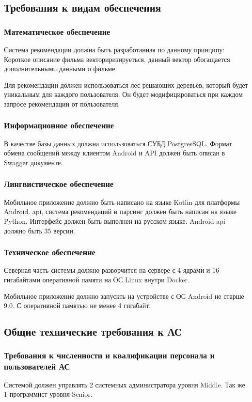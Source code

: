 \subsection{Требования к видам обеспечения}
\subsubsection{Математическое обеспечение}
Система рекомендации должна быть разработанная по данному принципу:
Короткое описание фильма векториризируеться, данный вектор обогащается дополнительными данными о фильме.

Для рекомендации должен использоваться лес решающих деревьев, который будет уникальным для каждого пользователя.
Он будет модифицироваться при каждом запросе рекомендации от пользователя.

\subsubsection{Информационное обеспечение}
В качестве базы данных должна использоваться СУБД PostgresSQL\@.
Формат обмена сообщений между клиентом Android и API должен быть описан в Swagger документе.


\subsubsection{Лингвистическое обеспечение}
Мобильное приложение должно быть написано на языке Kotlin для платформы Android.
api, система рекомендаций и парсинг должен быть написан на языке Python.
Интерфейс должен быть выполнен на русском языке.
Android api должно быть 35 версии.

\subsubsection{Техническое обеспечение}
Северная часть системы должно разворчится на сервере с 4 ядрами и 16 гигабайтами оперативной памяти на ОС Linux внутри
Docker.


Мобильное приложение должно запускть на устройстве с ОС Android не старше 9.0. С оперативной памятью не менее
4 гигабайт.


\subsection{Общие технические требования к АС}
\subsubsection{Требования к численности и квалификации персонала и пользователей АС}
Системой должен управлять 2 системных администратора уровня Middle.
Так же 1 программист уровня Senior.


